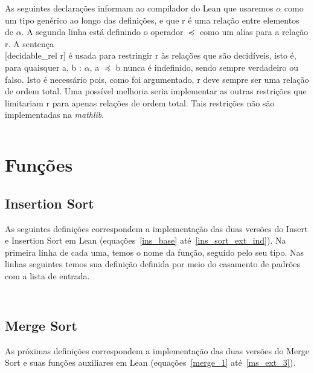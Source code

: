 \documentclass[12pt, oneside, a4paper,english,brazil]{abntex2}
\begin{document}
As seguintes declara\c{c}\~oes informam ao compilador do Lean que usaremos $\alpha$ como um tipo gen\'erico ao longo das defini\c{c}\~oes, e que \textsf{r} \'e uma rela\c{c}\~ao entre elementos de $\alpha$. A segunda linha est\'a definindo o operador \textsf{$\preceq$} como um alias para a rela\c{c}\~ao \textsf{r}. A senten\c{c}a\\ \textsf{[decidable\_rel r]} \'e usada para restringir \textsf{r} \`{a}s rela\c{c}\~oes que s\~ao decid\'iveis, isto \'e, para quaisquer \textsf{a, b : $\alpha$},
\textsf{a $\preceq$ b} nunca \'e indefinido, sendo sempre verdadeiro ou falso. Isto \'e
necess\'ario pois, como foi argumentado, \textsf{r} deve sempre ser uma rela\c{c}\~ao de
ordem total. Uma poss\'ivel melhoria seria implementar as outras restri\c{c}\~oes que limitariam \textsf{r} para apenas rela\c{c}\~oes de ordem total. Tais restri\c{c}\~oes n\~ao s\~ao implementadas na \textit{mathlib}.

\inputminted{lean}{declarations.lean}

\section{Fun\c{c}\~oes}

\subsection{Insertion Sort}

As seguintes defini\c{c}\~oes correspondem a implementa\c{c}\~ao das duas vers\~oes do
Insert e Insertion Sort em Lean (equa\c{c}\~oes~\ref{ins_base}
at\'e~\ref{ins_sort_ext_ind}). Na primeira linha de cada uma, temos o nome da
fun\c{c}\~ao, seguido pelo seu tipo. Nas linhas seguintes temos sua defini\c{c}\~ao
definida por meio do casamento de padr\~oes com a lista de entrada.

\inputminted{lean}{insertion_sort.lean}
\inputminted{lean}{insertion_sort_modified.lean}

\subsection{Merge Sort}

As pr\'oximas defini\c{c}\~oes correspondem a implementa\c{c}\~ao das duas
vers\~oes do Merge Sort e suas fun\c{c}\~oes auxiliares em Lean
(equa\c{c}\~oes~\ref{merge_1} at\'e~\ref{ms_ext_3}).
\end{document}
